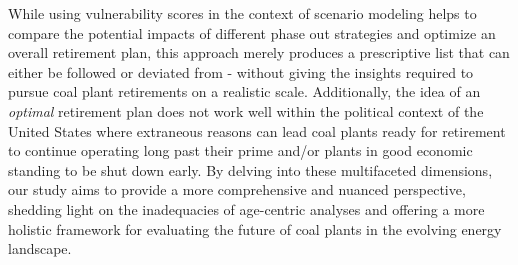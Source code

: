 While using vulnerability scores in the context of scenario modeling helps to compare the potential impacts of different phase out strategies and 
optimize an overall retirement plan, this approach merely produces a prescriptive list that can either be followed or deviated from - without giving 
the insights required to pursue coal plant retirements on a realistic scale. Additionally, the idea of an \textit{optimal} retirement plan does not work well 
within the political context of the United States where extraneous reasons can lead coal plants ready for retirement to continue operating long 
past their prime and/or plants in good economic standing to be shut down early. By delving into these multifaceted dimensions, our study aims to provide a 
more comprehensive and nuanced perspective, shedding light on the inadequacies of age-centric analyses and offering a more holistic 
framework for evaluating the future of coal plants in the evolving energy landscape.




